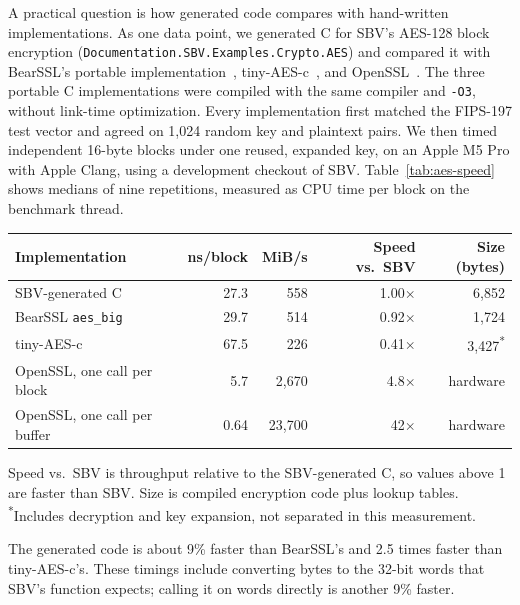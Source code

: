 \documentclass[review]{jfp-epi}
\newcommand{\code}[1]{\texttt{#1}}
\begin{document}
A practical question is how generated code compares with hand-written
implementations. As one data point, we generated C for SBV's AES-128 block encryption
(\code{Documentation.\allowbreak SBV.\allowbreak Examples.\allowbreak Crypto.\allowbreak AES}) and compared it
with BearSSL's portable implementation~\citep{bearssl}, tiny-AES-c~\citep{tinyaes},
and OpenSSL~\citep{openssl}. The three portable C implementations were compiled
with the same compiler and \code{-O3}, without link-time optimization. Every
implementation first matched the FIPS-197 test vector and agreed on 1,024 random
key and plaintext pairs. We then timed independent 16-byte blocks under one
reused, expanded key, on an Apple M5 Pro with Apple Clang, using a development
checkout of SBV. Table~\ref{tab:aes-speed} shows medians of nine repetitions,
measured as CPU time per block on the benchmark thread.
\par\medskip\noindent
\begin{minipage}{\linewidth}
\centering
\makeatletter{}\makeatother
\caption{AES-128 encryption of 16\,KiB buffers on one machine.}
\label{tab:aes-speed}
\begin{tabular}{lrrrr}
\toprule
Implementation & ns/block & MiB/s & Speed vs.\ SBV & Size (bytes) \\
\midrule
SBV-generated C              & 27.3 & 558      & 1.00$\times$ & 6{,}852 \\
BearSSL \code{aes\_big}      & 29.7 & 514      & 0.92$\times$ & 1{,}724 \\
tiny-AES-c                   & 67.5 & 226      & 0.41$\times$ & 3{,}427\textsuperscript{*} \\
OpenSSL, one call per block  & 5.7  & 2{,}670  & 4.8$\times$  & hardware \\
OpenSSL, one call per buffer & 0.64 & 23{,}700 & 42$\times$   & hardware \\
\bottomrule
\end{tabular}

\smallskip
{\footnotesize Speed vs.\ SBV is throughput relative to the SBV-generated C, so values
above 1 are faster than SBV. Size is compiled encryption code plus lookup tables.
\textsuperscript{*}Includes decryption and key expansion, not separated in this measurement.}
\end{minipage}\par\medskip

The generated code is about 9\% faster than BearSSL's and 2.5 times faster than
tiny-AES-c's. These timings include converting bytes to the 32-bit words that
SBV's function expects; calling it on words directly is another 9\% faster.
\end{document}
